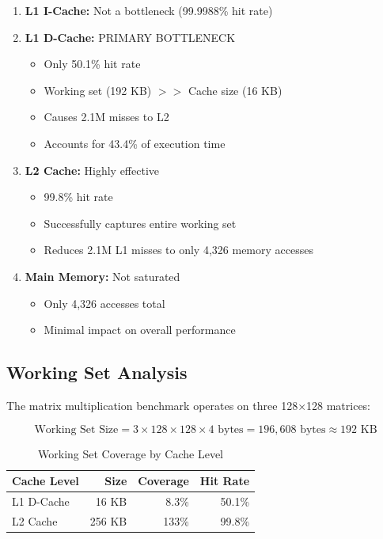 \documentclass[11pt,a4paper]{article}
\begin{document}
\begin{enumerate}[noitemsep]
    \item \textbf{L1 I-Cache:} Not a bottleneck (99.9988\% hit rate)

    \item \textbf{L1 D-Cache:} PRIMARY BOTTLENECK
    \begin{itemize}[noitemsep]
        \item Only 50.1\% hit rate
        \item Working set (192 KB) $>>$ Cache size (16 KB)
        \item Causes 2.1M misses to L2
        \item Accounts for 43.4\% of execution time
    \end{itemize}

    \item \textbf{L2 Cache:} Highly effective
    \begin{itemize}[noitemsep]
        \item 99.8\% hit rate
        \item Successfully captures entire working set
        \item Reduces 2.1M L1 misses to only 4,326 memory accesses
    \end{itemize}

    \item \textbf{Main Memory:} Not saturated
    \begin{itemize}[noitemsep]
        \item Only 4,326 accesses total
        \item Minimal impact on overall performance
    \end{itemize}
\end{enumerate}

\subsection{Working Set Analysis}

The matrix multiplication benchmark operates on three 128×128 matrices:

\begin{equation}
\text{Working Set Size} = 3 \times 128 \times 128 \times 4 \text{ bytes} = 196,608 \text{ bytes} \approx 192 \text{ KB}
\end{equation}

\begin{table}[H]
\centering
\caption{Working Set Coverage by Cache Level}
\begin{tabular}{lrrr}
\toprule
\textbf{Cache Level} & \textbf{Size} & \textbf{Coverage} & \textbf{Hit Rate} \\
\midrule
L1 D-Cache & 16 KB & 8.3\% & 50.1\% \\
L2 Cache & 256 KB & 133\% & 99.8\% \\
\bottomrule
\end{tabular}
\end{table}
\end{document}
